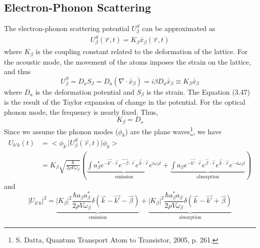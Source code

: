 \subsection{Electron-Phonon Scattering}
The electron-phonon scattering potential $U_{\beta}^{S}$ can be approximated as \begin{align}
    U_{\beta}^{S}(\overset{\rightharpoonup}{r},t) = K_{\beta}\widetilde{x_{\beta}}(\overset{\rightharpoonup}{r},t)
\end{align} where $K_{\beta}$ is the coupling constant related to the deformation of the lattice. For the acoustic mode, the movement of the atoms imposes the strain on the lattice, and thus \begin{equation}
    U_{\beta}^{S} = D_{a}S_{\beta} = D_{a}(\nabla\cdot\widetilde{x_{\beta}}) = i\beta D_{a}\widetilde{x_{\beta}} \equiv K_{\beta}\widetilde{x_{\beta}}
\end{equation} where $D_{a}$ is the deformation potential and $S_{\beta}$ is the strain. The Equation (3.47) is the result of the Taylor expansion of change in the potential. For the optical phonon mode, the frequency is nearly fixed. Thus, \begin{equation}
    K_{\beta} = D_{o}
\end{equation} Since we assume the phonon modes ($\phi_{k}$) are the plane waves\footnote{S. Datta, Quantum Transport Atom to Transistor, 2005, p. 261.}, we have \begin{align}
    U_{k'k}(t)& = \big<\phi_{k'}\big|U_{\beta}^{S}(\overset{\rightharpoonup}{r},t)\big|\phi_{k}\big>\nonumber\\
    & = K_{\beta}\sqrt{\frac{\hbar}{2\rho V\omega_{\beta}}}\left(\underbrace{\int a_{\beta}^{*}e^{-\overset{\rightharpoonup}{k'}\cdot\overset{\rightharpoonup}{r}}e^{\overset{\rightharpoonup}{-\beta}\cdot\overset{\rightharpoonup}{r}}e^{\overset{\rightharpoonup}{k}\cdot\overset{\rightharpoonup}{r}}e^{i\omega_{\beta}t}}_{\text{emission}}+\underbrace{\int a_{\beta}e^{-\overset{\rightharpoonup}{k'}\cdot\overset{\rightharpoonup}{r}}e^{\overset{\rightharpoonup}{\beta}\cdot\overset{\rightharpoonup}{r}}e^{\overset{\rightharpoonup}{k}\cdot\overset{\rightharpoonup}{r}}e^{-i\omega_{\beta}t}}_{\text{absorption}}\right)
\end{align} and \begin{equation}
    \big|U_{k'k}\big|^{2} = \underbrace{\big|K_{\beta}\big|^{2}\frac{\hbar a_{\beta}a_{\beta}^{*}}{2\rho V\omega_{\beta}}\delta(\overset{\rightharpoonup}{k}-\overset{\rightharpoonup}{k'}-\overset{\rightharpoonup}{\beta})}_{\text{emission}}+\underbrace{\big|K_{\beta}\big|^{2}\frac{\hbar a_{\beta}^{*}a_{\beta}}{2\rho V\omega_{\beta}}\delta(\overset{\rightharpoonup}{k}-\overset{\rightharpoonup}{k'}+\overset{\rightharpoonup}{\beta})}_{\text{absorption}}

\end{equation}
